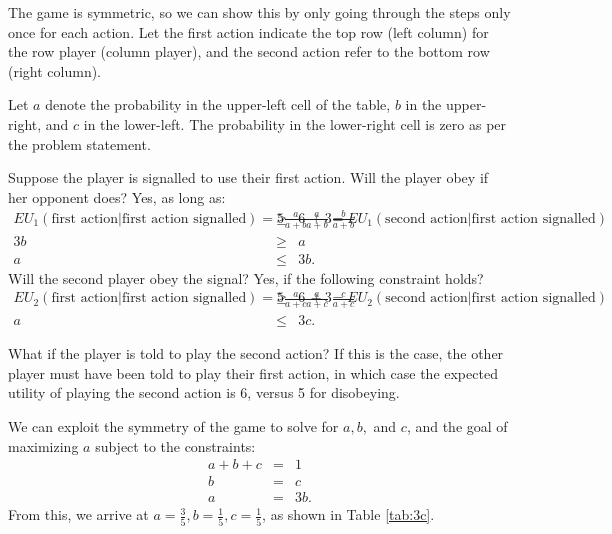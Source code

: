 \begin{answer}{3}
The game is symmetric, so we can show this by only going through the steps only once for each action. Let the first action indicate the top row (left column) for the row player (column player), and the second action refer to the bottom row (right column).

Let $a$ denote the probability in the upper-left cell of the table, $b$ in the upper-right, and $c$ in the lower-left. The probability in the lower-right cell is zero as per the problem statement.

Suppose the player is signalled to use their first action. Will the player obey if her opponent does? Yes, as long as:
\begin{eqnarray*}
EU_1(\text{first action}|\text{first action signalled}) = 5\frac{a}{a+b} + 3\frac{b}{a+b} &\geq& 6\frac{a}{a+b} = EU_1(\text{second action}|\text{first action signalled}) \\
3b &\geq& a \\
a &\leq& 3b.
\end{eqnarray*}
Will the second player obey the signal? Yes, if the following constraint holds? 
\begin{eqnarray*}
EU_2(\text{first action}|\text{first action signalled}) = 5\frac{a}{a+c} + 3\frac{c}{a+c} &\geq& 6\frac{a}{a+c} = EU_2(\text{second action}|\text{first action signalled}) \\
a &\leq& 3c.
\end{eqnarray*}

What if the player is told to play the second action? If this is the case, the other player must have been told to play their first action, in which case the expected utility of playing the second action is 6, versus 5 for disobeying. 

We can exploit the symmetry of the game to solve for $a,b,$ and $c$, and the goal of maximizing $a$ subject to the constraints:
\begin{eqnarray*}
a+b+c &=& 1 \\
b &=& c \\
a &=& 3b.
\end{eqnarray*}
From this, we arrive at $a=\frac{3}{5}, b=\frac{1}{5}, c=\frac{1}{5}$, as shown in Table \ref{tab:3c}.

\end{answer}


